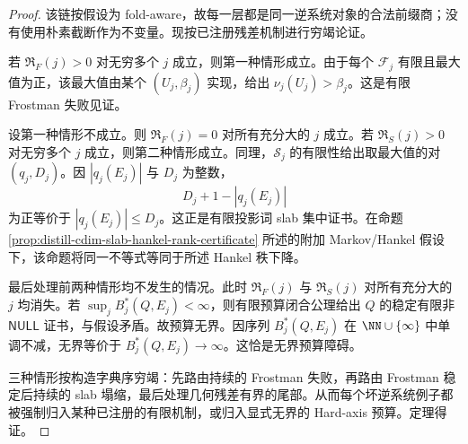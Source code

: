 \begin{proof}
该链按假设为 fold-aware，故每一层都是同一逆系统对象的合法前缀商；没有使用朴素截断作为不变量。现按已注册残差机制进行穷竭论证。

若 \(\mathfrak R_F(j)>0\) 对无穷多个 \(j\) 成立，则第一种情形成立。由于每个 \(\mathcal F_j\) 有限且最大值为正，该最大值由某个 \((U_j,\beta_j)\) 实现，给出 \(\nu_j(U_j)>\beta_j\)。这是有限 Frostman 失败见证。

设第一种情形不成立。则 \(\mathfrak R_F(j)=0\) 对所有充分大的 \(j\) 成立。若 \(\mathfrak R_S(j)>0\) 对无穷多个 \(j\) 成立，则第二种情形成立。同理，\(\mathcal S_j\) 的有限性给出取最大值的对 \((q_j,D_j)\)。因 \(|q_j(E_j)|\) 与 \(D_j\) 为整数，
\[
D_j+1-|q_j(E_j)|
\]
为正等价于 \(|q_j(E_j)|\le D_j\)。这正是有限投影词 slab 集中证书。在命题 \ref{prop:distill-cdim-slab-hankel-rank-certificate} 所述的附加 Markov/Hankel 假设下，该命题将同一不等式等同于所述 Hankel 秩下降。

最后处理前两种情形均不发生的情况。此时 \(\mathfrak R_F(j)\) 与 \(\mathfrak R_S(j)\) 对所有充分大的 \(j\) 均消失。若 \(\sup_j B_j^\ast(Q,E_j)<\infty\)，则有限预算闭合公理给出 \(Q\) 的稳定有限非 \(\mathsf{NULL}\) 证书，与假设矛盾。故预算无界。因序列 \(B_j^\ast(Q,E_j)\) 在 \(\NN\cup\{\infty\}\) 中单调不减，无界等价于 \(B_j^\ast(Q,E_j)\to\infty\)。这恰是无界预算障碍。

三种情形按构造字典序穷竭：先路由持续的 Frostman 失败，再路由 Frostman 稳定后持续的 slab 塌缩，最后处理几何残差有界的尾部。从而每个坏逆系统例子都被强制归入某种已注册的有限机制，或归入显式无界的 Hard-axis 预算。定理得证。
\end{proof}


